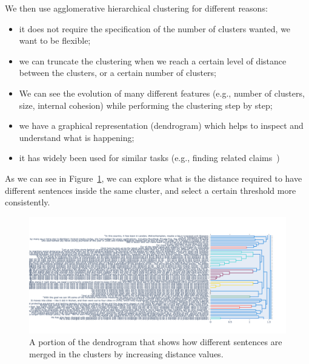 We then use agglomerative hierarchical clustering for different reasons:
\begin{itemize}
    \item it does not require the specification of the number of clusters wanted, we want to be flexible;
    \item we can truncate the clustering when we reach a certain level of distance between the clusters, or a certain number of clusters;
    \item We can see the evolution of many different features (e.g., number of clusters, size, internal cohesion) while performing the clustering step by step;
    \item we have a graphical representation (dendrogram) which helps to inspect and understand what is happening;
    \item it has widely been used for similar tasks (e.g., finding related claims~\cite{TODO:meedan_talk_similarity:http://ceur-ws.org/Vol-2607/short4.pdf:or_better})
\end{itemize}


As we can see in Figure~\ref{fig:dendrogram}, we can explore what is the distance required to have different sentences inside the same cluster, and select a certain threshold more consistently.
\begin{figure}[!htb]
    \centering
    \includegraphics[width=\linewidth]{figures/dendrogram.png}
    \caption{A portion of the dendrogram that shows how different sentences are merged in the clusters by increasing distance values.}
    \label{fig:dendrogram}
\end{figure}

